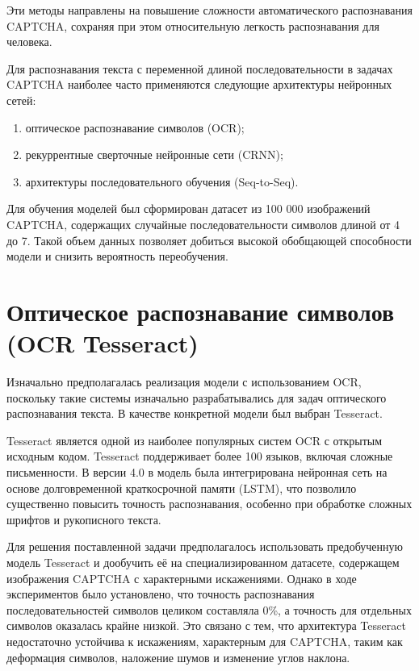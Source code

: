 \documentclass{altsu-report}
\begin{document}
Эти методы направлены на повышение сложности автоматического распознавания CAPTCHA, сохраняя при этом относительную легкость распознавания для человека. 

Для распознавания текста с переменной длиной последовательности в задачах CAPTCHA наиболее часто применяются следующие архитектуры нейронных сетей:

\begin{enumerate}
    \item оптическое распознавание символов (OCR);
    \item рекуррентные сверточные нейронные сети (CRNN);
    \item архитектуры последовательного обучения (Seq-to-Seq).
\end{enumerate}

Для обучения моделей был сформирован датасет из 100 000 изображений CAPTCHA, содержащих случайные последовательности символов длиной от 4 до 7. Такой объем данных позволяет добиться высокой обобщающей способности модели и снизить вероятность переобучения.

\section*{Оптическое распознавание символов (OCR Tesseract)}

Изначально предполагалась реализация модели с использованием OCR, поскольку такие системы изначально разрабатывались для задач оптического распознавания текста. В качестве конкретной модели был выбран Tesseract.

Tesseract является одной из наиболее популярных систем OCR с открытым исходным кодом. Tesseract поддерживает более 100 языков, включая сложные письменности. В версии 4.0 в модель была интегрирована нейронная сеть на основе долговременной краткосрочной памяти (LSTM), что позволило существенно повысить точность распознавания, особенно при обработке сложных шрифтов и рукописного текста.

Для решения поставленной задачи предполагалось использовать предобученную модель Tesseract и дообучить её на специализированном датасете, содержащем изображения CAPTCHA с характерными искажениями. Однако в ходе экспериментов было установлено, что точность распознавания последовательностей символов целиком составляла 0\%, а точность для отдельных символов оказалась крайне низкой. Это связано с тем, что архитектура Tesseract недостаточно устойчива к искажениям, характерным для CAPTCHA, таким как деформация символов, наложение шумов и изменение углов наклона.
\end{document}

